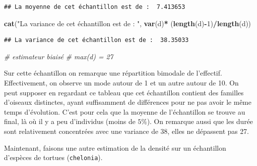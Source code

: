 \documentclass[
]{book}
\newenvironment{Shaded}{\begin{snugshade}}{\end{snugshade}}
\newcommand{\CommentTok}[1]{\textcolor[rgb]{0.56,0.35,0.01}{\textit{#1}}}
\newcommand{\DataTypeTok}[1]{\textcolor[rgb]{0.13,0.29,0.53}{#1}}
\newcommand{\DecValTok}[1]{\textcolor[rgb]{0.00,0.00,0.81}{#1}}
\newcommand{\FloatTok}[1]{\textcolor[rgb]{0.00,0.00,0.81}{#1}}
\newcommand{\KeywordTok}[1]{\textcolor[rgb]{0.13,0.29,0.53}{\textbf{#1}}}
\newcommand{\NormalTok}[1]{#1}
\newcommand{\OperatorTok}[1]{\textcolor[rgb]{0.81,0.36,0.00}{\textbf{#1}}}
\newcommand{\StringTok}[1]{\textcolor[rgb]{0.31,0.60,0.02}{#1}}
\begin{document}
\begin{verbatim}
## La moyenne de cet échantillon est de :  7.413653
\end{verbatim}

\begin{Shaded}
\begin{Highlighting}[]
\KeywordTok{cat}\NormalTok{(}\StringTok{"La variance de cet échantillon est de : "}\NormalTok{, }\KeywordTok{var}\NormalTok{(d)}\OperatorTok{*}\StringTok{ }\NormalTok{(}\KeywordTok{length}\NormalTok{(d)}\OperatorTok{-}\DecValTok{1}\NormalTok{)}\OperatorTok{/}\KeywordTok{length}\NormalTok{(d))}
\end{Highlighting}
\end{Shaded}

\begin{verbatim}
## La variance de cet échantillon est de :  38.35033
\end{verbatim}

\begin{Shaded}
\begin{Highlighting}[]
\CommentTok{# estimateur biaisé}
\CommentTok{# max(d) = 27}
\end{Highlighting}
\end{Shaded}

Sur cette échantillon on remarque une répartition bimodale de l'effectif. Effectivement, on observe un mode autour de 1 et un autre autour de 10. On peut supposer en regardant ce tableau que cet échantillon contient des familles d'oiseaux distinctes, ayant suffisamment de différences pour ne pas avoir le même temps d'évolution. C'est pour cela que la moyenne de l'échantillon se trouve au final, là où il y a peu d'individus (moins de \(5\%\)). On remarque aussi que les durée sont relativement concentrées avec une variance de \(38\), elles ne dépassent pas 27.

Maintenant, faisons une autre estimation de la densité sur un échantillon d'espèces de tortues (\texttt{chelonia}).

\begin{Shaded}
\end{Shaded}
\end{document}
